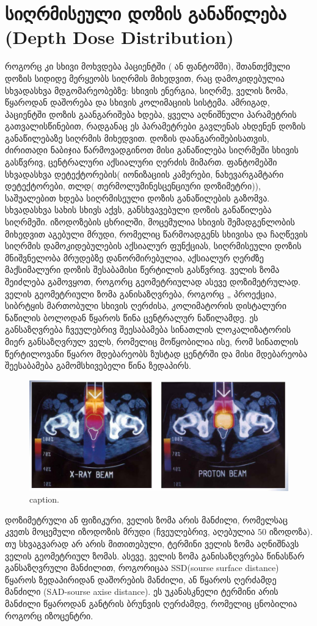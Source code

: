 \documentclass[12pt,a4paper,]{report}
\begin{document}
\section{სიღრმისეული დოზის განაწილება (Depth Dose Distribution)}
როგორც კი სხივი მოხვდება პაციენტში ( ან ფანტომში), შთანთქმული დოზის სიდიდე მერყეობს სიღრმის მიხედვით, რაც დამოკიდებულია სხვადასხვა 
მდგომარეობებზე: სხივის ენერგია, სიღრმე, ველის ზომა, წყაროდან დაშორება და სხივის კოლიმაციის სისტემა. ამრიგად, პაციენტში დოზის გაანგარიშება ხდება, ყველა აღნიშნული პარამეტრის გათვალისწინებით, რადგანაც ეს პარამეტრები გავლენას ახდენენ დოზის განაწილებაზე სიღრმის მიხედვით. დოზის დაანგარიშებისათვის, ძირითადი ნაბიჯია წარმოვადგინოთ მისი განაწილება სიღრმეში სხივის გასწვრივ, ცენტრალური აქსიალური ღერძის მიმართ. 
ფანტომებში სხვადასხვა დეტექტორების( იონიზაციის კამერები, ნახევარგამტარი დეტექტორები, თლდ( თერმოლუმინესცენციური დოზიმეტრი)),  საშუალებით ხდება სიღრმისეული დოზის განაწილების გაზომვა. სხვადასხვა სახის სხივს აქვს, განსხვავებული დოზის განაწილება სიღრმეში. იზოდოზების ცხრილში, მოცემულია სხივის შემადგენლობის მიხედვით აგებული მრუდი, რომელიც წარმოადგენს სხივისა და ჩაღწევის სიღრმის დამოკიდებულების 
აქსიალურ ფუნქციას, სიღრმისეული დოზის მნიშვნელობა მრუდებზე დანორმირებულია, აქსიალურ ღერძზე მაქსიმალური დოზის შესაბამისი წერტილის გასწვრივ. ველის ზომა შეიძლება გამოვყოთ, როგორც გეომეტრიულად ასევე დოზიმეტრულად. ველის გეომეტრიული ზომა განისაზღვრება, როგორც „ პროექცია, სიბრტყის მართობული სხივის ღერძისა, კოლიმატორის დისტალური ნაწილის ბოლოდან წყაროს წინა ცენტრალურ ნაწილამდე. ეს განსაზღვრება ჩვეულებრივ შეესაბამება სინათლის ლოკალიზატორის მიერ განსაზღვრულ ველს, რომელიც მოწყობილია ისე, რომ სინათლის წერტილოვანი წყარო მდებარეობს ზუსტად ცენტრში და მისი მდებარეობა შეესაბამება გამომსხივებელი წინა ზედაპირს. 
	\begin{figure}[h]
	    \centering
        \includegraphics[width = 15cm]{images/depth_dose_distribution_01}
        \caption{caption.}
    \end{figure}
დოზიმეტრული ან ფიზიკური, ველის ზომა არის მანძილი, რომელსაც კვეთს მოცემული იზოდოზის მრუდი (ჩვეულებრივ, აღებულია $50$ იზოდოზა). 
თუ სხვაგვარად არ არის მითითებული, ტერმინი ველის ზომა აღნიშნავს ველის გეომეტრიულ ზომას. ასევე, ველის ზომა განისაზღვრება წინასწარ განსაზღვრული მანძილით, როგორიცაა SSD(sourse surface distance) წყაროს ზედაპირიდან დაშორების მანძილი, ან წყაროს ღერძამდე მანძილი (SAD-sourse axise distance). ეს უკანასკნელი ტერმინი არის მანძილი წყაროდან განტრის ბრუნვის ღერძამდე, რომელიც ცნობილია როგორც იზოცენტრი.
\end{document}
